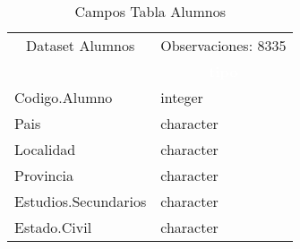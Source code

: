 \begin{table}[!h]

\caption{\label{tab:tabla_Dataset_Alumnos}Campos Tabla Alumnos}
\centering
\fontsize{10}{12}\selectfont
\begin{tabular}[t]{ll}
\toprule
\multicolumn{1}{c}{Dataset Alumnos} & \multicolumn{1}{c}{Observaciones: 8335} \\
\cmidrule(l{3pt}r{3pt}){1-1} \cmidrule(l{3pt}r{3pt}){2-2}
\rowcolor{black}  \multicolumn{1}{c}{\textcolor{white}{\textbf{variable}}} & \multicolumn{1}{c}{\textcolor{white}{\textbf{tipo}}}\\
\midrule
\rowcolor{gray!6}  Codigo.Alumno & integer\\
Pais & character\\
\rowcolor{gray!6}  Localidad & character\\
Provincia & character\\
\rowcolor{gray!6}  Estudios.Secundarios & character\\
\addlinespace
Estado.Civil & character\\
\bottomrule
\end{tabular}
\end{table}
